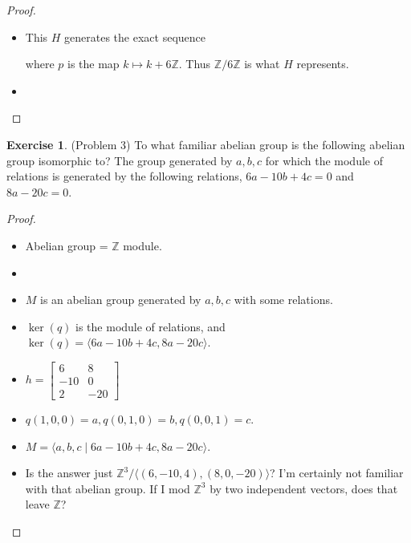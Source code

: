 \documentclass[12pt, psamsfonts]{amsart}
\theoremstyle{definition}
\newtheorem*{exer}{Exercise}
\theoremstyle{remark}
\numberwithin{equation}{section}
\begin{document}
\begin{proof}
  $ $
  \begin{itemize}
    \item
      This $H$ generates the exact sequence

      \begin{center}
      \end{center}

      where $p$ is the map $k \mapsto k + 6\mathbb{Z}$.
      Thus $\mathbb{Z}/6\mathbb{Z}$ is what $H$ represents.
    \item
      \todo[inline,caption={}]{
      }
  \end{itemize}
\end{proof}

\begin{exer}{(Problem 3)}
  To what familiar abelian group is the following abelian group isomorphic to?
  The group generated by $a, b, c$ for which the module of relations is generated by the following relations, $6a - 10b + 4c = 0$ and $8a - 20c = 0$.
\end{exer}

\begin{proof}
  \begin{itemize}
    \item
      Abelian group = $\mathbb{Z}$ module.
    \item
      \begin{center}
      \end{center}
    \item
      $M$ is an abelian group generated by $a, b, c$ with some relations.
    \item
      $\ker(q)$ is the module of relations, and $\ker(q) = \langle 6a - 10b + 4c, 8a - 20c \rangle$.
    \item
      $h = \begin{bmatrix} 6 & 8 \\ -10 & 0 \\ 2 & -20 \end{bmatrix}$
    \item
      $q(1, 0, 0) = a, q(0, 1, 0) = b, q(0, 0, 1) = c$.
    \item
      $M = \langle a, b, c \mid 6a - 10b + 4c, 8a - 20c \rangle$.
    \item
      Is the answer just $\mathbb{Z}^3 / \langle (6, -10, 4), (8, 0, -20) \rangle$?
      I'm certainly not familiar with that abelian group.
      If I mod $\mathbb{Z}^3$ by two independent vectors, does that leave $\mathbb{Z}$?
  \end{itemize}
\end{proof}
\end{document}
